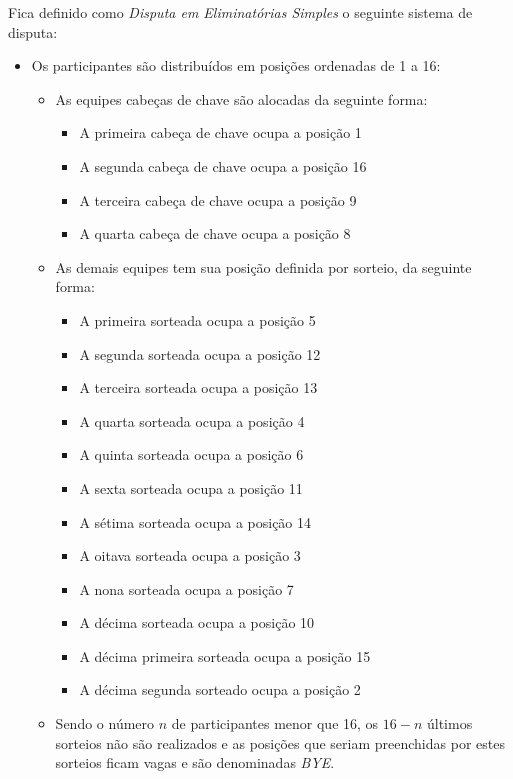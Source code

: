 \noindent
Fica definido como \textit{Disputa em Eliminatórias Simples} o seguinte sistema de disputa:
\begin{itemize}[noitemsep]
	\item Os participantes são distribuídos em posições ordenadas de 1 a 16:
	\begin{itemize}[noitemsep]
		\item As equipes cabeças de chave são alocadas da seguinte forma:
		\begin{itemize}[noitemsep]
			\item A primeira cabeça de chave ocupa a posição 1
			\item A segunda cabeça de chave ocupa a posição 16
			\item A terceira cabeça de chave ocupa a posição 9
			\item A quarta cabeça de chave ocupa a posição 8
		\end{itemize}

		\item As demais equipes tem sua posição definida por sorteio, da seguinte forma:
		\begin{itemize}[noitemsep]
			\item A primeira sorteada ocupa a posição 5
			\item A segunda sorteada ocupa a posição 12
			\item A terceira sorteada ocupa a posição 13
			\item A quarta sorteada ocupa a posição 4
			\item A quinta sorteada ocupa a posição 6
			\item A sexta sorteada ocupa a posição 11
			\item A sétima sorteada ocupa a posição 14
			\item A oitava sorteada ocupa a posição 3
			\item A nona sorteada ocupa a posição 7
			\item A décima sorteada ocupa a posição 10
			\item A décima primeira sorteada ocupa a posição 15
			\item A décima segunda sorteado ocupa a posição 2
		\end{itemize}

		\item Sendo o número $n$ de participantes menor que 16, os $16 - n$ últimos sorteios não são realizados e as posições que seriam preenchidas por estes sorteios ficam vagas e são denominadas \textit{BYE}.
	\end{itemize}


\end{itemize}
